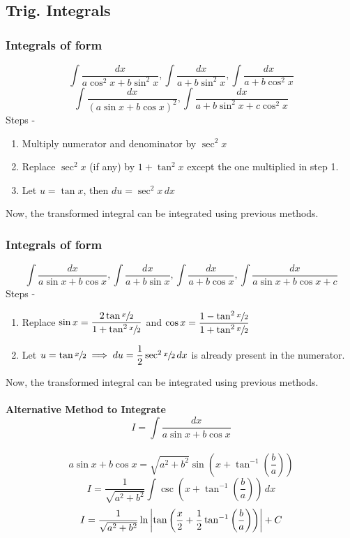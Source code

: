 \documentclass{article}
\begin{document}
\subsection{Trig. Integrals}
\subsubsection{Integrals of form}
$$\int \dfrac{dx}{a \cos^2 x+b\sin ^2 x}, \int \dfrac{dx}{a+b \sin^2 x}, \int \dfrac{dx}{a+b\cos^2 x}$$
$$\int \dfrac{dx}{\left(a\sin x+b\cos x\right)^2}, \int \dfrac{dx}{a+b\sin^2 x+c \cos ^2 x}$$
Steps -
\begin{enumerate}[1.]
    \item Multiply numerator and denominator by $\sec^2 x$
    \item Replace $\sec^2 x$ (if any) by $1+\tan^2 x$  except the one multiplied in step 1.
    \item Let $u=\tan x$, then $du=\sec^2 x \, dx$
\end{enumerate}
Now, the transformed integral can be integrated using previous methods.

\subsubsection{Integrals of form }
$$\int \dfrac{dx}{a\sin x +b \cos x}, \int \dfrac{dx}{a+b\sin x}, \int \dfrac{dx}{a+b\cos x}, \int \dfrac{dx}{a\sin x + b \cos x + c} $$
Steps -
\begin{enumerate}[1.]
    \item Replace $\sin x = \dfrac{2\tan \sfrac{x}{2}}{1+\tan^2 \sfrac{x}{2}}$ and $\cos x = \dfrac{1-\tan^2 \sfrac{x}{2}}{1+\tan^2 \sfrac{x}{2}}$
    \item Let $u=\tan \sfrac{x}{2} \implies du= \dfrac{1}{2} \sec^2 \sfrac{x}{2} \, dx$ is already present in the numerator.
\end{enumerate}
Now, the transformed integral can be integrated using previous methods.

\paragraph{Alternative Method to Integrate $$I=\int \dfrac{dx}{a\sin x + b \cos x}$$}

$$a\sin x + b \cos x = \sqrt{a^2+b^2} \sin (x+\tan^{-1} \left(\dfrac{b}{a}\right)) $$
$$I=\dfrac{1}{\sqrt{a^2+b^2}}\int \csc \left(x+ \tan^{-1}\left(\dfrac{b}{a}\right) \right) \, dx $$
$$I=\dfrac{1}{\sqrt{a^2+b^2}}\ln \abs{\tan \left(\dfrac{x}{2}+ \dfrac{1}{2} \tan^{-1} \left(\dfrac{b}{a}\right) \right)}+C$$
\end{document}
